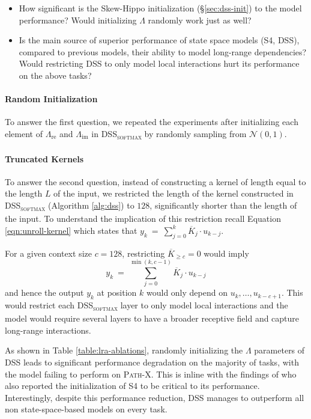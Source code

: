 \begin{itemize}[leftmargin=*,topsep=0pt,itemsep=4pt,parsep=0pt]
    \item How significant is the Skew-Hippo initialization (\S\ref{sec:dss-init}) to the model performance? Would initializing $\Lambda$ randomly work just as well?
    \item Is the main source of superior performance of state space models (S4, DSS), compared to previous models, their ability to model long-range dependencies? Would restricting DSS to only model local interactions hurt its performance on the above tasks?
\end{itemize}

\paragraph{Random Initialization} To answer the first question, we repeated the experiments after initializing each element of $\Lambda_\mathrm{re}$ and $\Lambda_\mathrm{im}$ in \textsc{DSS}\textsubscript{\textsc{softmax}}  by randomly sampling from $\mathcal{N}(0,1)$.

\paragraph{Truncated Kernels} To answer the second question, instead of constructing a kernel of length equal to the length $L$ of the input, we restricted the length of the kernel constructed in \textsc{DSS}\textsubscript{\textsc{softmax}}  (Algorithm \ref{alg:dss}) to $128$, significantly shorter than the length of the input. To understand the implication of this restriction recall Equation \ref{eqn:unroll-kernel} which states that $y_k \ = \ \sum_{j=0}^k \overline{K}_j\cdot u_{k-j}$.

For a given context size $c = 128$, restricting $\overline{K}_{\geq c} = 0$ would imply $$y_k \ = \ \sum_{j=0}^{\min(k, c-1)} \overline{K}_j\cdot u_{k-j}$$ and hence the output $y_k$ at position $k$ would only depend on $u_k,\ldots,u_{k-c+1}$. This would restrict each \textsc{DSS}\textsubscript{\textsc{softmax}}  layer to only model local interactions and the model would require several layers to have a broader receptive field and capture long-range interactions. 

As shown in Table \ref{table:lra-ablations}, randomly initializing the $\Lambda$ parameters of DSS leads to significant performance degradation on the majority of tasks, with the model failing to perform on \textsc{Path-X}. This is inline with the findings of \cite{gu2022efficiently} who also reported the initialization of S4 to be critical to its performance. Interestingly, despite this performance reduction, DSS manages to outperform all non state-space-based models on every task.

